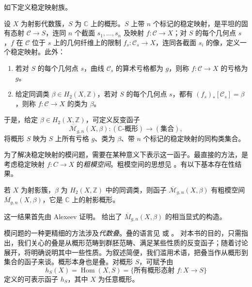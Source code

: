 如下定义稳定映射族。

\begin{definition}\label{def:stable-map-family}
设 $X$ 为射影代数簇，$S$ 为 $\mathbb C$ 上的概形。$S$ 上带 $n$ 个标记的稳定映射，是平坦的固有态射 $\mathcal C\to S$，连同 $n$ 个截面 $s_1,\ldots,s_n$ 及映射 $f:\mathcal C\to X$；对 $S$ 的每个几何点 $s$，$f$ 在 $\mathcal C$ 位于 $s$ 上的几何纤维上的限制 $f_s:\mathcal C_s\to X$，连同各截面 $s_i$ 的像，定义一个稳定映射。此外：
\begin{enumerate}[label=(\roman*)]
\item 若对 $S$ 的每个几何点 $s$，曲线 $\mathcal C_s$ 的算术亏格都为 $g$，则称 $f:\mathcal C\to X$ 的亏格为 $g$。
\item 给定同调类 $\beta\in H_2(X,\mathbb Z)$，若对 $S$ 的每个几何点 $s$，都有 $(f_s)_*[\mathcal C_s]=\beta$，则称 $f:\mathcal C\to X$ 的类为 $\beta$。
\end{enumerate}
\end{definition}
于是，给定 $\beta\in H_2(X,\mathbb Z)$，可定义反变函子
\[
\overline{\mathcal M}_{g,n}(X,\beta):
(\mathbb C\text{-概形})\longrightarrow(\text{集合}),
\]
将概形 $S$ 映为 $S$ 上所有亏格 $g$、类为 $\beta$、带 $n$ 个标记的稳定映射的同构类集合。

为了解决稳定映射的模问题，需要在某种意义下表示这一函子。最直接的方法，是考虑稳定映射 $f:C\to X$ 的\emph{粗模空间}。粗模空间的思想见 。有以下基本存在性结果。

\begin{theorem}\label{thm:stable-map-coarse-moduli}
若 $X$ 为射影簇，$\beta$ 为 $H_2(X,\mathbb Z)$ 中的同调类，则函子
$\overline{\mathcal M}_{g,n}(X,\beta)$ 有粗模空间 $\overline M_{g,n}(X,\beta)$，它是 $\mathbb C$ 上的射影概形。
\end{theorem}
这一结果首先由 Alexeev  证明。 给出了 $\overline M_{g,n}(X,\beta)$ 的相当显式的构造。

模问题的一种更精细的方法涉及\emph{代数叠}。叠的语言见  或 。
对本书的目的，只需指出，我们关心的叠是从概形范畴到群胚范畴、满足某些性质的反变函子；随着讨论展开，将明确说明其中一些性质。为叙述简便，我们滥用术语，把叠当作从概形到集合的函子来谈。概形本身也是叠。对概形 $S$，可赋予由
\begin{equation}\label{eq:representable-scheme-functor}
h_S(X)=\operatorname{Hom}(X,S)
=\{\text{所有概形态射 }f:X\to S\}
\end{equation}
定义的可表示函子 $h_S$，其中 $X$ 为任意概形。

